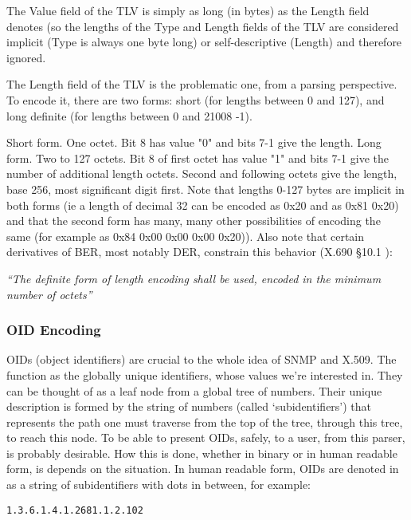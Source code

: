 The Value field of the TLV is simply as long (in bytes) as the Length 
field denotes (so the lengths of the Type and Length fields of the TLV are 
considered implicit (Type is always one byte long) or self-descriptive 
(Length) and therefore ignored.

The Length field of the TLV is the problematic one, from a parsing 
perspective. To encode it, there are two forms: short (for lengths between 
0 and 127), and long definite (for lengths between 0 and 21008 -1).
 
Short form. One octet. Bit 8 has value "0" and bits 7-1 give the length. 
Long form. Two to 127 octets. Bit 8 of first octet has value "1" and bits 
7-1 give the number of additional length octets. Second and following 
octets give the length, base 256, most significant digit first.
\cite{bib:x690}
Note that lengths 0-127 bytes are implicit in both forms (ie a length of 
decimal 32 can be encoded as 0x20 and as 0x81 0x20) and that the second 
form has many, many other possibilities of encoding the same (for example 
as 0x84 0x00 0x00 0x00 0x20)). Also note that certain derivatives of BER, 
most notably DER, constrain this behavior (X.690 §10.1 \cite{bib:x690}):

\textit{“The definite form of 
length encoding shall be used, encoded in the minimum number of octets”}

\subsubsection{OID Encoding}

OIDs (object identifiers) are crucial to the whole idea of SNMP and X.509. 
The function as the globally unique identifiers, whose values we’re 
interested in. They can be thought of as a leaf node from a global tree of 
numbers. Their unique description is formed by the string of numbers 
(called ‘subidentifiers’) that represents the path one must traverse 
from the top of the tree, through this tree, to reach this node.
To be able to present OIDs, safely, to a user, from this parser, is 
probably desirable. How this is done, whether in binary or in human 
readable form, is depends on the situation. In human readable form, OIDs 
are denoted in as a string of subidentifiers with dots in between,
for example:

\begin{changemargin}{-60mm}{0mm}
\begin{myquote}
\begin{verbatim}
1.3.6.1.4.1.2681.1.2.102
\end{verbatim}
\end{myquote}
\end{changemargin}


